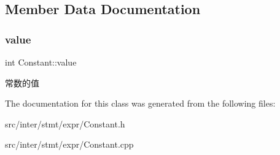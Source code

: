 \subsection{Member Data Documentation}
\mbox{\label{class_constant_a132c9bc0ec98681bcbf723d87ddd722d}} 
\subsubsection{\texorpdfstring{value}{value}}
{\footnotesize\ttfamily int Constant\+::value}

常数的值 

The documentation for this class was generated from the following files\+:\begin{DoxyCompactItemize}
\item 
src/inter/stmt/expr/Constant.\+h\item 
src/inter/stmt/expr/Constant.\+cpp\end{DoxyCompactItemize}
